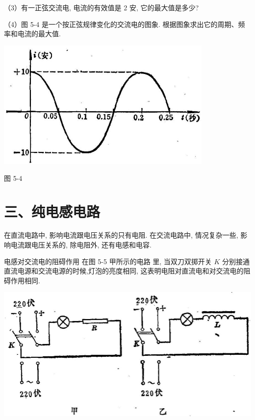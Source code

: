 \documentclass[10pt]{article}
\begin{document}
（3）有一正弦交流电, 电流的有效值是 2 安, 它的最大值是多少?

（4）图 5-4 是一个按正弦规律变化的交流电的图象. 根据图象求出它的周期、频率和电流的最大值.

\begin{center}
\includegraphics[max width=0.8\textwidth]{images/01913056-1f15-74d8-9184-9aab52c9d66b_166_242362.jpg}
\end{center}

图 5-4

\section*{三、纯电感电路}

在直流电路中, 影响电流跟电压关系的只有电阻. 在交流电路中, 情况复杂一些, 影响电流跟电压关系的, 除电阻外, 还有电感和电容.

电感对交流电的阻碍作用 在图 5-5 甲所示的电路 里, 当双刀双掷开关 \(K\) 分别接通直流电源和交流电源的时候,灯泡的亮度相同, 这表明电阻对直流电和对交流电的阻碍作用相同.

\begin{center}
\includegraphics[max width=1.0\textwidth]{images/01913056-1f15-74d8-9184-9aab52c9d66b_167_308456.jpg}
\end{center}
\end{document}
